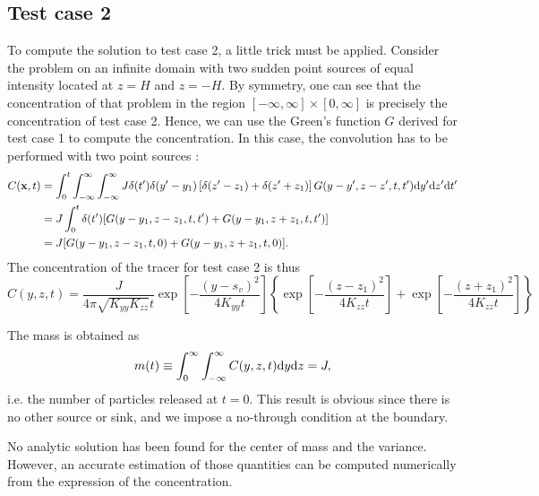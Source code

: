 \subsection{Test case 2}
To compute the solution to test case 2, a little trick must be applied. Consider the problem on an infinite domain with two sudden point sources of equal intensity located at $z = H$ and $z = -H$. By symmetry, one can see that the concentration of that problem in the region $[-\infty, \infty] \times [0, \infty]$ is precisely the concentration of test case 2. Hence, we can use the Green's function $G$ derived for test case 1 to compute the concentration. In this case, the convolution has to be performed with two point sources :
\begin{align}
	C(\b x,t) &= \int_{0}^{t} \int_{-\infty}^{\infty} \int_{-\infty}^{\infty} J \delta(t') \delta(y'- y_1)\left[\delta(z'-z_1)+\delta(z'+z_1)\right] G(y-y',z-z',t,t') \rm dy' \rm dz' \rm dt' \nonumber\\
	&= J \int_{0}^{t} \delta(t')[G(y-y_1,z-z_1,t,t')+G(y-y_1,z+z_1,t,t')] \label{tc2_eq2} \nonumber\\
	&= J[G(y-y_1,z-z_1,t,0)+G(y-y_1,z+z_1,t,0)].
\end{align}
The concentration of the tracer for test case 2 is thus
\begin{equation}
	C(y,z,t) = \frac{J}{4\pi\sqrt{K_{yy}K_{zz}}t}\exp\left[-\frac{(y-s_v)^2}{4K_{yy}t}\right]\left\{\exp\left[-\frac{(z-z_1)^2}{4K_{zz}t} \right] + \exp\left[-\frac{(z+z_1)^2}{4K_{zz}t} \right] \right\}
\end{equation}

The mass is obtained as
\begin{equation}
	m(t) \equiv \int_{0}^{\infty} \int_{-\infty}^{\infty} C(y,z,t) \rm dy \rm dz = J,
\end{equation}
i.e. the number of particles released at $t=0$. This result is obvious since there is no other source or sink, and we impose a no-through condition at the boundary.

No analytic solution has been found for the center of mass and the variance. However, an accurate estimation of those quantities can be computed numerically from the expression of the concentration. 


